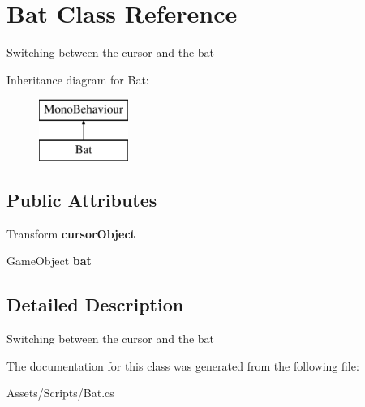 \hypertarget{class_bat}{}\section{Bat Class Reference}
\label{class_bat}


Switching between the cursor and the bat  


Inheritance diagram for Bat\+:\begin{figure}[H]
\begin{center}
\leavevmode
\includegraphics[height=2.000000cm]{class_bat}
\end{center}
\end{figure}
\subsection*{Public Attributes}
\begin{DoxyCompactItemize}
\item 
Transform {\bfseries cursor\+Object}\hypertarget{class_bat_a4e5daf44b66a2ba98a2ec0aa51017256}{}\label{class_bat_a4e5daf44b66a2ba98a2ec0aa51017256}

\item 
Game\+Object {\bfseries bat}\hypertarget{class_bat_a959ae00e01a92793c6a5dc5f611aea00}{}\label{class_bat_a959ae00e01a92793c6a5dc5f611aea00}

\end{DoxyCompactItemize}


\subsection{Detailed Description}
Switching between the cursor and the bat 



The documentation for this class was generated from the following file\+:\begin{DoxyCompactItemize}
\item 
Assets/\+Scripts/Bat.\+cs\end{DoxyCompactItemize}
